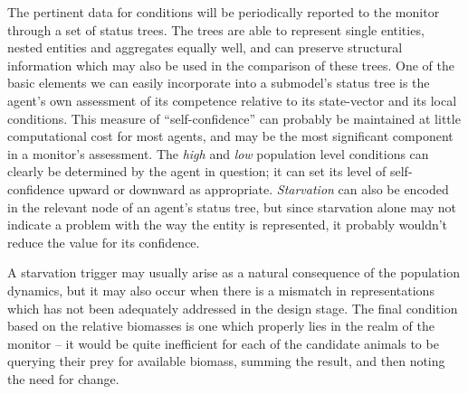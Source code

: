 The pertinent data for conditions will be periodically reported to the
monitor through a set of status trees. The trees are able to represent
single entities, nested entities and aggregates equally well, and can
preserve structural information which may also be used in the
comparison of these trees.  One of the basic elements we can easily
incorporate into a sub\-model's status tree is the agent's own
assessment of its competence relative to its state-vector and its
local conditions. This measure of ``self-confidence'' can probably be
maintained at little computational cost for most agents, and may be
the most significant component in a monitor's assessment. The
\emph{high} and \emph{low} population level conditions can clearly be
determined by the agent in question; it can set its level of
self-confidence upward or downward as appropriate. \emph{Starvation}
can also be encoded in the relevant node of an agent's status tree,
but since starvation alone may not indicate a problem with the way the
entity is represented, it probably wouldn't reduce the value for its
confidence.

A starvation trigger may usually arise as a natural consequence of the
population dynamics, but it may also occur when there is a mismatch in
rep\-re\-sen\-ta\-tions which has not been adequately addressed in the design
stage.  The final condition based on the relative biomasses is one
which properly lies in the realm of the monitor -- it would be quite
inefficient for each of the candidate animals to be querying their
prey for available biomass, summing the result, and then noting the
need for change.


